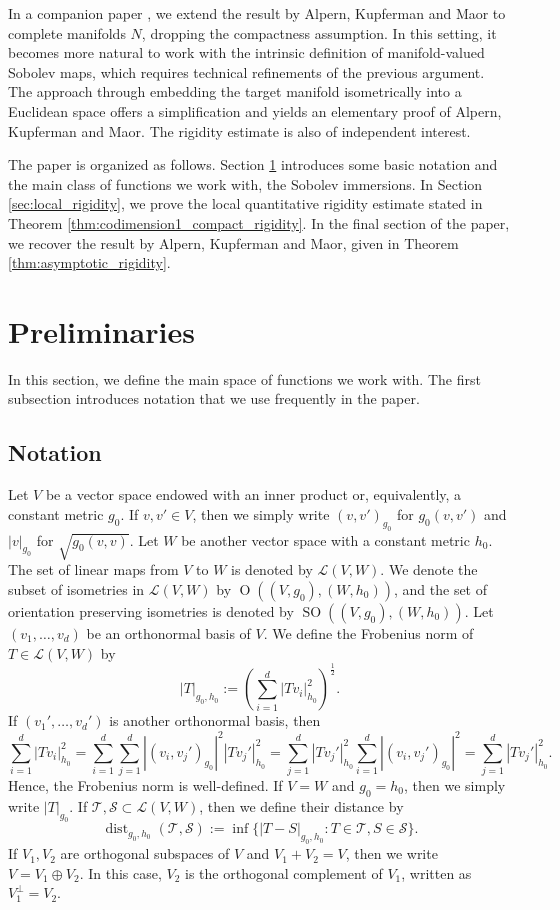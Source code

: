 \documentclass{article}
\numberwithin{equation}{section}
\theoremstyle{definition}
\theoremstyle{remark}
\DeclareMathOperator{\dist}{dist}
\DeclareMathOperator{\Ort}{O}
\DeclareMathOperator{\SO}{SO}
\begin{document}
In a companion paper \cite{B2}, we extend the result by Alpern, Kupferman and Maor to complete manifolds $N$, dropping the compactness assumption. In this setting, it becomes more natural to work with the intrinsic definition of manifold-valued Sobolev maps, which requires technical refinements of the previous argument. The approach through embedding the target manifold isometrically into a Euclidean space offers a simplification and yields an elementary proof of Alpern, Kupferman and Maor. The rigidity estimate is also of independent interest.

The paper is organized as follows. Section \ref{sec:preliminaries} introduces some basic notation and the main class of functions we work with, the Sobolev immersions. In Section \ref{sec:local_rigidity}, we prove the local quantitative rigidity estimate stated in Theorem \ref{thm:codimension1_compact_rigidity}. In the final section of the paper, we recover the result by Alpern, Kupferman and Maor, given in Theorem \ref{thm:asymptotic_rigidity}.

\section{Preliminaries} \label{sec:preliminaries}

In this section, we define the main space of functions we work with. The first subsection introduces notation that we use frequently in the paper.

\subsection{Notation} \label{sec:notation}

Let $V$ be a vector space endowed with an inner product or, equivalently, a constant metric $g_0$. If $v, v' \in V$, then we simply write $(v, v')_{g_0}$ for $g_0(v, v')$ and $|v|_{g_0}$ for $\sqrt{g_0(v, v)}$. Let $W$ be another vector space with a constant metric $h_0$. The set of linear maps from $V$ to $W$ is denoted by $\mathcal{L}(V, W)$. We denote the subset of isometries in $\mathcal{L}(V, W)$ by $\Ort((V, g_0), (W, h_0))$, and the set of orientation preserving isometries is denoted by $\SO((V, g_0), (W, h_0))$. Let $(v_1, \dots, v_d)$ be an orthonormal basis of $V$. We define the Frobenius norm of $T \in \mathcal{L}(V, W)$ by
\[
|T|_{g_0, h_0} := \left(\sum_{i = 1}^d |Tv_i|_{h_0}^2\right)^\frac{1}{2}.
\]
If $(v_1', \dots, v_d')$ is another orthonormal basis, then
\[
\sum_{i = 1}^d |Tv_i|_{h_0}^2 = \sum_{i = 1}^d \sum_{j = 1}^d |(v_i, v_j')_{g_0}|^2 |Tv_j'|_{h_0}^2 = \sum_{j = 1}^d |Tv_j'|_{h_0}^2 \sum_{i = 1}^d |(v_i, v_j')_{g_0}|^2 = \sum_{j = 1}^d |Tv_j'|_{h_0}^2.
\]
Hence, the Frobenius norm is well-defined. If $V = W$ and $g_0 = h_0$, then we simply write $|T|_{g_0}$. If $\mathcal{T}, \mathcal{S} \subset \mathcal{L}(V, W)$, then we define their distance by
\[
\dist_{g_0, h_0}(\mathcal{T}, \mathcal{S}) := \inf \{|T - S|_{g_0, h_0} : T \in \mathcal{T}, S \in \mathcal{S}\}.
\]
If $V_1, V_2$ are orthogonal subspaces of $V$ and $V_1 + V_2 = V$, then we write $V = V_1 \oplus V_2$. In this case, $V_2$ is the orthogonal complement of $V_1$, written as $V_1^\perp = V_2$.
\end{document}
